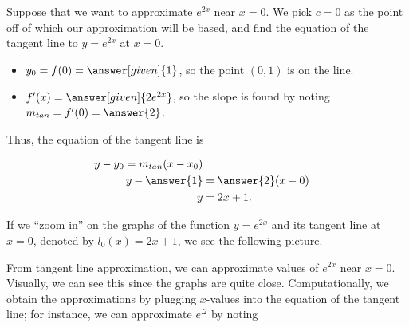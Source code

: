 \documentclass{ximera}
\begin{document}
\begin{question}
Suppose that we want to approximate $e^{2x}$ near $x=0$.  We pick
$c=0$ as the point off of which our approximation will be based, and
find the equation of the tangent line to $y=e^{2x}$ at $x=0$.
\begin{itemize}
\item $y_0=f(0) = \answer[given]{1}$, so the point $(0,1)$ is on the line.
\item $f'(x) = \answer[given]{2e^{2x}}$, so the slope is found by noting $m_{tan} = f'(0) = \answer{2}$.
\end{itemize}
Thus, the equation of the tangent line is

\begin{align*}
y-y_0 = m_{tan} (x-x_0) \\
y- \answer{1} &=\answer{2}(x-0) \\
y&=2x+1 .
\end{align*}

If we ``zoom in'' on the graphs of the function $y=e^{2x}$ and its tangent line at $x=0$, denoted by $l_0(x)=2x+1$, we see the following picture.

\begin{image}
\end{image}
\end{question}


From tangent line approximation, we can approximate values of $e^{2x}$
near $x=0$.  Visually, we can see this since the graphs are quite
close.  Computationally, we obtain the approximations by plugging
$x$-values into the equation of the tangent line; for instance, we can
approximate $e^{.2}$ by noting
\end{document}

